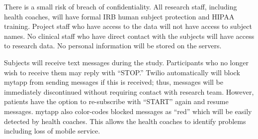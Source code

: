 There is a small risk of breach of confidentiality. All research staff, including health coaches, will have formal IRB human subject protection and HIPAA training. Project staff who have access to the data will not have access to subject names. No clinical staff who have direct contact with the subjects will have access to research data. No personal information will be stored on the servers. 

Subjects will receive  text messages during the study. Participants who no longer wish to receive  them may reply with “STOP.” Twilio automatically will block mytapp from sending messages if this is received; thus, messages will be immediately discontinued without requiring contact with research team. However, patients have the option to re-subscribe with “START” again and resume messages. mytapp also color-codes blocked messages as “red” which will be easily detected by health coaches. This allows the health coaches to identify problems including loss of mobile service.

